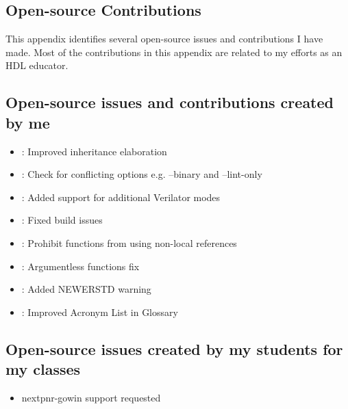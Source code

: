 
\begin{appendices}



\chapter{Open-source Contributions}
\label{appx:contributions}

This appendix identifies several open-source issues and contributions I have made. Most of the contributions in this appendix are related to my efforts as an HDL educator.

\section{Open-source issues and contributions created by me}

\begin{itemize}
    \item [\pullrequesticon] : Improved inheritance elaboration
    \item [\mergedicon] : Check for conflicting options e.g. --binary and --lint-only
    \item [\pullrequesticon] : Added support for additional Verilator modes
    \item [\pullrequesticon] : Fixed build issues
    \item [\mergedicon] : Prohibit functions from using non-local references
    \item [\mergedicon] : Argumentless functions fix
    \item [\mergedicon] : Added NEWERSTD warning
    \item [\mergedicon] : Improved Acronym List in Glossary
\end{itemize}

\section{Open-source issues created by my students for my classes}

\begin{itemize}
    \item [\issueclosedicon]  nextpnr-gowin support requested
\end{itemize}




\end{appendices}
